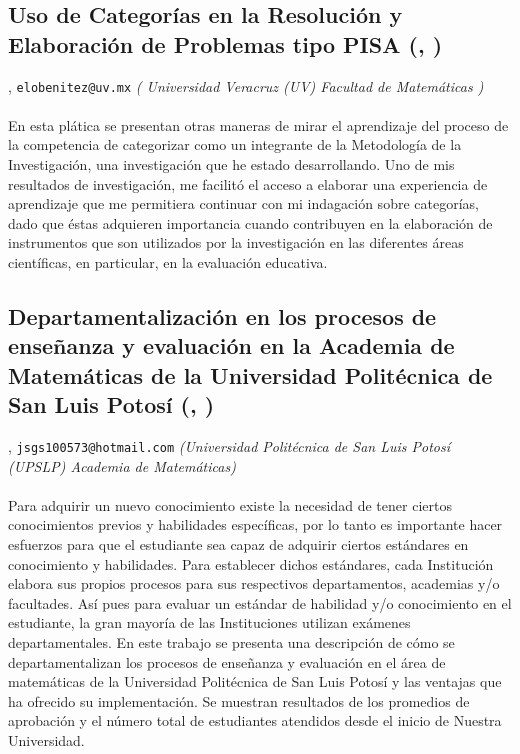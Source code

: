 \subsection{\sffamily Uso de Categorías en la Resolución y Elaboración de Problemas tipo PISA {\footnotesize (, )}} \label{reg-1701} 
, {\tt elobenitez@uv.mx}  {\slshape ( Universidad Veracruz (UV)  Facultad de Matemáticas )}\\
\\
\noindent  En esta plática se presentan otras maneras de mirar el aprendizaje del proceso de la competencia de categorizar como un integrante de la Metodología de la Investigación, una investigación que he estado desarrollando. Uno de mis resultados  de investigación, me facilitó el acceso a elaborar una experiencia de aprendizaje que me permitiera continuar con mi indagación sobre categorías, dado que éstas adquieren importancia cuando contribuyen en la elaboración de instrumentos que son utilizados por la investigación en las diferentes áreas científicas, en particular, en la evaluación educativa. 
\subsection{\sffamily Departamentalización en los procesos de enseñanza y  evaluación en la Academia de Matemáticas de la Universidad Politécnica de San Luis Potosí {\footnotesize (, )}} \label{reg-942} 
, {\tt jsgs100573@hotmail.com}  {\slshape (Universidad Politécnica de San Luis Potosí (UPSLP) Academia de Matemáticas)}\\
\\
\noindent  Para adquirir un nuevo conocimiento existe la necesidad de tener ciertos conocimientos previos y habilidades específicas, por lo tanto es importante hacer esfuerzos para que el  estudiante sea capaz de adquirir ciertos estándares en conocimiento y habilidades. Para establecer dichos estándares, cada Institución elabora sus propios procesos para sus respectivos departamentos, academias y/o facultades.  Así pues para evaluar un estándar de habilidad y/o conocimiento en el estudiante, la gran mayoría de las Instituciones utilizan exámenes departamentales.  En este trabajo se presenta una descripción de cómo se departamentalizan los procesos de enseñanza y evaluación en el área de matemáticas de la Universidad Politécnica de San Luis Potosí  y las ventajas que ha ofrecido su implementación. Se muestran resultados de los promedios de aprobación y el número total de estudiantes atendidos desde el inicio de Nuestra Universidad. 
